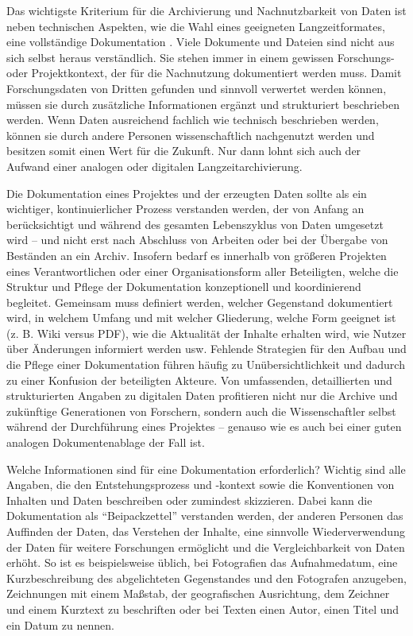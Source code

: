 \hyphenation{
}

Das wichtigste Kriterium für die Archivierung und Nachnutzbarkeit von Daten ist neben technischen Aspekten, wie die Wahl eines geeigneten Langzeitformates, eine vollständige Dokumentation . Viele Dokumente und Dateien sind nicht aus sich selbst heraus verständlich. Sie stehen immer in einem gewissen Forschungs- oder Projektkontext, der für die Nachnutzung dokumentiert werden muss. Damit Forschungsdaten von Dritten gefunden und sinnvoll verwertet werden können, müssen sie durch zusätzliche Informationen ergänzt und strukturiert beschrieben werden. Wenn Daten ausreichend fachlich wie technisch beschrieben werden, können sie durch andere Personen wissenschaftlich nachgenutzt werden und besitzen somit einen Wert für die Zukunft. Nur dann lohnt sich auch der Aufwand einer analogen oder digitalen Langzeitarchivierung.

Die Dokumentation eines Projektes und der erzeugten Daten sollte als ein wichtiger, kontinuierlicher Prozess verstanden werden, der von Anfang an berücksichtigt und während des gesamten Lebenszyklus von Daten umgesetzt wird -- und nicht erst nach Abschluss von Arbeiten oder bei der Übergabe von Beständen an ein Archiv. Insofern bedarf es innerhalb von größeren Projekten eines Verantwortlichen oder einer Organisationsform aller Beteiligten, welche die Struktur und Pflege der Dokumentation konzeptionell und koordinierend begleitet. Gemeinsam muss definiert werden, welcher Gegenstand dokumentiert wird, in welchem Umfang und mit welcher Gliederung, welche Form geeignet ist (z. B. Wiki versus PDF), wie die Aktualität der Inhalte erhalten wird, wie Nutzer über Änderungen informiert werden usw. Fehlende Strategien für den Aufbau und die Pflege einer Dokumentation führen häufig zu Unübersichtlichkeit und dadurch zu einer Konfusion der beteiligten Akteure. Von umfassenden, detaillierten und strukturierten Angaben zu  digitalen Daten profitieren nicht nur die Archive und zukünftige Generationen von Forschern, sondern auch die Wissenschaftler selbst während der Durchführung eines Projektes -- genauso wie es auch bei einer guten analogen Dokumentenablage der Fall ist.

Welche Informationen sind für eine Dokumentation erforderlich? Wichtig sind alle Angaben, die den Entstehungsprozess und -kontext sowie die Konventionen von Inhalten und Daten beschreiben oder zumindest skizzieren. Dabei kann die Dokumentation als "`Beipackzettel"' verstanden werden, der anderen Personen das Auffinden der Daten, das Verstehen der Inhalte, eine sinnvolle Wiederverwendung der Daten für weitere Forschungen ermöglicht und die Vergleichbarkeit von Daten erhöht. So ist es beispielsweise üblich, bei Fotografien das Aufnahmedatum, eine Kurzbeschreibung des abgelichteten Gegenstandes und den Fotografen anzugeben, Zeichnungen mit einem Maßstab, der geografischen Ausrichtung, dem Zeichner und einem Kurztext zu beschriften oder bei Texten einen Autor, einen Titel und ein Datum zu nennen.

